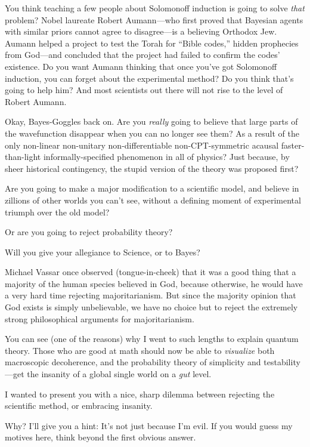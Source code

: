 {
 You think teaching a few people about Solomonoff induction is
going to solve \textit{that} problem? Nobel laureate Robert
Aumann---who first proved that Bayesian agents with similar priors
cannot agree to disagree---is a believing Orthodox Jew. Aumann helped a
project to test the Torah for ``Bible
codes,'' hidden prophecies from God---and concluded
that the project had failed to confirm the codes'
existence. Do you want Aumann thinking that once you've
got Solomonoff induction, you can forget about the experimental method?
Do you think that's going to help him? And most
scientists out there will not rise to the level of Robert Aumann.}

{
 Okay, Bayes-Goggles back on. Are you \textit{really} going to
believe that large parts of the wavefunction disappear when you can no
longer see them? As a result of the only non-linear non-unitary
non-differentiable non-CPT-symmetric acausal faster-than-light
informally-specified phenomenon in all of physics? Just because, by
sheer historical contingency, the stupid version of the theory was
proposed first?}

{
 Are you going to make a major modification to a scientific model,
and believe in zillions of other worlds you can't see,
without a defining moment of experimental triumph over the old model?}

{
 Or are you going to reject probability theory?}

{
 Will you give your allegiance to Science, or to Bayes?}

{
 Michael Vassar once observed (tongue-in-cheek) that it was a good
thing that a majority of the human species believed in God, because
otherwise, he would have a very hard time rejecting majoritarianism.
But since the majority opinion that God exists is simply unbelievable,
we have no choice but to reject the extremely strong philosophical
arguments for majoritarianism.}

{
 You can see (one of the reasons) why I went to such lengths to
explain quantum theory. Those who are good at math should now be able
to \textit{visualize} both macroscopic decoherence, and the probability
theory of simplicity and testability---get the insanity of a global
single world on a \textit{gut} level.}

{
 I wanted to present you with a nice, sharp dilemma between
rejecting the scientific method, or embracing insanity.}

{
 Why? I'll give you a hint: It's
not just because I'm evil. If you would guess my
motives here, think beyond the first obvious answer.}

